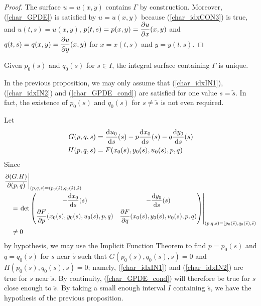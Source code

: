 \begin{proof}
 The surface $u=u(x,y)$ contains $\Gamma$ by construction.
Moreover, (\ref{char_GPDE}) is satisfied by $u=u(x,y)$ because
(\ref{char_idxCON3}) is true, and
$u(t,s) = u(x,y)$, $\displaystyle p(t,s) = p(x,y) = \frac{\partial{u}}{\partial x}(x,y)$
and $\displaystyle q(t,s) = q(x,y) = \frac{\partial{u}}{\partial y}(x,y)$
for $x=x(t,s)$ and $y=y(t,s)$.
\end{proof}

\begin{rmk}
Given $p_0(s)$ and $q_0(s)$ for $s\in I$, the integral surface
containing $\Gamma$ is unique.
\end{rmk}

\begin{rmk}
In the previous proposition, we may only assume that     \label{char_PQCON}
(\ref{char_idxIN1}), (\ref{char_idxIN2}) and (\ref{char_GPDE_cond})
are satisfied for one value $s=\tilde{s}$.  In fact, the existence of $p_0(s)$
and $q_0(s)$ for $s\neq \tilde{s}$ is not even required.

Let
\begin{align*}
G(p,q,s) &= \frac{\mathrm{d}u_0}{\mathrm{d}{s}}(s) - p \frac{\mathrm{d}x_0}{\mathrm{d}{s}}(s) - q \frac{\mathrm{d}y_0}{\mathrm{d}{s}}(s) \\
H(p,q,s) &= F(x_0(s),y_0(s),u_0(s),p,q)
\end{align*}
Since
\begin{align*}
& \frac{\partial(G.H)}{\partial(p,q)}
\bigg|_{(p,q,s)=(p_0(\tilde{s}),q_0(\tilde{s}),\tilde{s})} \\
&\quad = \left. \det
\begin{pmatrix}
\displaystyle -\frac{\mathrm{d}x_0}{\mathrm{d}{s}}(s) &
\displaystyle -\frac{\mathrm{d}y_0}{\mathrm{d}{s}}(s) \\[0.7em]
\displaystyle \frac{\partial{F}}{\partial p}(x_0(s),y_0(s),u_0(s),p,q) &
\displaystyle \frac{\partial{F}}{\partial q}(x_0(s),y_0(s),u_0(s),p,q) \\
\end{pmatrix} \right|_{(p,q,s)=(p_0(\tilde{s}),q_0(\tilde{s}),\tilde{s})}\\
&\quad \neq 0
\end{align*}
by hypothesis, we may use the Implicit Function
Theorem to find $p=p_0(s)$ and $q=q_0(s)$ for $s$ near $\tilde{s}$ such that
$G(p_0(s), q_0(s),s) = 0$ and $H(p_0(s),q_0(s),s)=0$; namely,
(\ref{char_idxIN1}) and (\ref{char_idxIN2}) are true for $s$ near $\tilde{s}$.
By continuity, (\ref{char_GPDE_cond}) will therefore be true for $s$
close enough to $\tilde{s}$.  By taking a small enough interval $I$
containing $\tilde{s}$, we have the hypothesis of the previous proposition.
\end{rmk}

